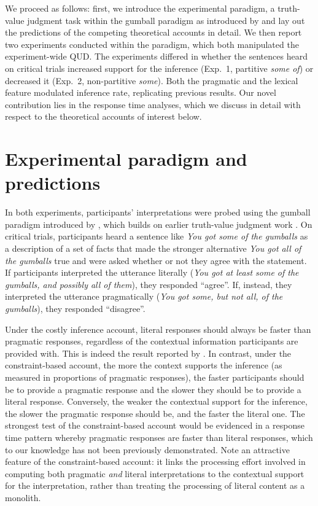 \documentclass[10pt,letterpaper]{article}
\begin{document}
We proceed as follows: first, we introduce the experimental paradigm, a truth-value judgment task within the gumball paradigm as introduced by  and lay out the predictions of the competing theoretical accounts in detail. We then report two experiments conducted within the paradigm, which both manipulated the experiment-wide QUD. The experiments differed in whether the sentences heard on critical trials increased support for the inference (Exp.~1, partitive \emph{some of}) or decreased it (Exp.~2, non-partitive \emph{some}). Both the pragmatic and the lexical feature modulated inference rate, replicating previous results. Our  novel contribution lies in the response time analyses, which we discuss in detail with respect to the theoretical accounts of interest below.

\section{Experimental paradigm and predictions}

In both experiments, participants' interpretations were probed using the gumball paradigm introduced by , which builds on earlier truth-value judgment work \cite{BottNoveck2004}. On critical trials, participants heard a sentence like \emph{You got some of the gumballs} as a description of a set of facts that made the stronger alternative \emph{You got all of the gumballs} true and were asked whether or not they agree with the statement. If participants interpreted the utterance literally (\emph{You got at least some of the gumballs, and possibly all of them}), they responded ``agree''. If, instead, they interpreted the utterance pragmatically (\emph{You got some, but not all, of the gumballs}), they responded ``disagree''. 

Under the costly inference account, literal responses should always be faster than pragmatic responses, regardless of the contextual information participants are provided with. This is indeed the result reported by . In contrast, under the constraint-based account, the more the context supports the inference (as measured in proportions of pragmatic responses), the faster participants should be to provide a pragmatic response and  the slower they should be to provide a literal response. Conversely, the weaker the contextual support for the inference, the slower the pragmatic response should be, and the faster the literal one. The strongest test of the constraint-based account would be evidenced in a response time pattern whereby pragmatic responses are faster than literal responses, which to our knowledge has not been previously demonstrated. Note an attractive feature of the constraint-based account: it links the processing effort involved in computing both pragmatic \emph{and} literal interpretations to the contextual support for the interpretation, rather than treating the processing of literal content as a monolith.
\end{document}
